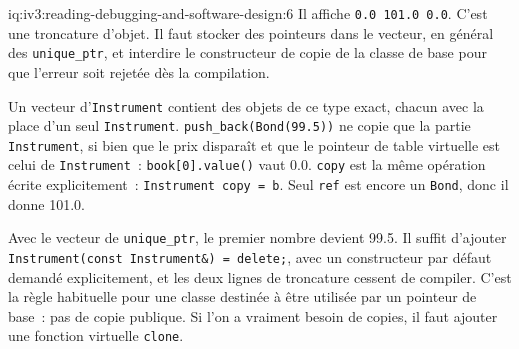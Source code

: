 \begin{solution}{iq:iv3:reading-debugging-and-software-design:6}
Il affiche \texttt{0.0 101.0 0.0}. C'est une troncature d'objet. Il faut stocker des pointeurs dans le vecteur, en général des \texttt{unique\_ptr}, et interdire le constructeur de copie de la classe de base pour que l'erreur soit rejetée dès la compilation.

Un vecteur d'\texttt{Instrument} contient des objets de ce type exact, chacun avec la place d'un seul \texttt{Instrument}. \texttt{push\_back(Bond(99.5))} ne copie que la partie \texttt{Instrument}, si bien que le prix disparaît et que le pointeur de table virtuelle est celui de \texttt{Instrument}~: \texttt{book[0].value()} vaut 0.0. \texttt{copy} est la même opération écrite explicitement~: \texttt{Instrument copy = b}. Seul \texttt{ref} est encore un \texttt{Bond}, donc il donne 101.0.

Avec le vecteur de \texttt{unique\_ptr}, le premier nombre devient 99.5. Il suffit d'ajouter \texttt{Instrument(const Instrument\&) = delete;}, avec un constructeur par défaut demandé explicitement, et les deux lignes de troncature cessent de compiler. C'est la règle habituelle pour une classe destinée à être utilisée par un pointeur de base~: pas de copie publique. Si l'on a vraiment besoin de copies, il faut ajouter une fonction virtuelle \texttt{clone}.


\end{solution}

